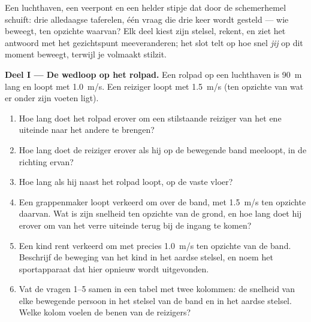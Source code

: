 \begin{problem}
\label{pb:g10:relative-motion:1}
Een luchthaven, een veerpont en een helder stipje dat door de
schemerhemel schuift: drie alledaagse taferelen, één vraag die drie keer
wordt gesteld --- wie beweegt, ten opzichte waarvan? Elk deel kiest zijn
stelsel, rekent, en ziet het antwoord met het gezichtspunt meeveranderen;
het slot telt op hoe snel \emph{jij} op dit moment beweegt, terwijl je
volmaakt stilzit.

\medskip
\noindent\textbf{Deel I --- De wedloop op het rolpad.}
Een rolpad op een luchthaven is \qty{90}{m} lang en loopt met
\qty{1.0}{m/s}. Een reiziger loopt met \qty{1.5}{m/s} (ten opzichte van
wat er onder zijn voeten ligt).
\begin{enumerate}
  \item Hoe lang doet het rolpad erover om een stilstaande reiziger van
        het ene uiteinde naar het andere te brengen?
  \item Hoe lang doet de reiziger erover als hij op de bewegende band
        meeloopt, in de richting ervan?
  \item Hoe lang als hij naast het rolpad loopt, op de vaste vloer?
  \item Een grappenmaker loopt verkeerd om over de band, met
        \qty{1.5}{m/s} ten opzichte daarvan. Wat is zijn snelheid ten
        opzichte van de grond, en hoe lang doet hij erover om van het
        verre uiteinde terug bij de ingang te komen?
  \item Een kind rent verkeerd om met precies \qty{1.0}{m/s} ten opzichte
        van de band. Beschrijf de beweging van het kind in het aardse
        stelsel, en noem het sportapparaat dat hier opnieuw wordt
        uitgevonden.
  \item Vat de vragen 1--5 samen in een tabel met twee kolommen: de
        snelheid van elke bewegende persoon in het stelsel van de band en
        in het aardse stelsel. Welke kolom voelen de benen van de
        reizigers?
\end{enumerate}


\end{problem}

